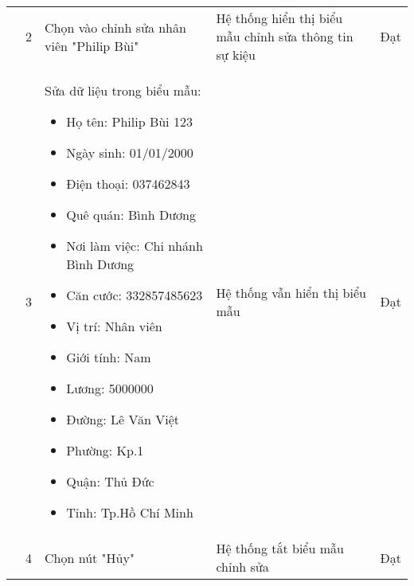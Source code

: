 {\begin{longtable}{| p{2.5cm}| p{1cm}| p{5.5cm}| p{4.5cm} | p{1.5cm} |}
        \cline{2-5}
         & 2 & Chọn vào chỉnh sửa nhân viên "Philip Bùi" & Hệ thống hiển thị biểu mẫu chỉnh sửa thông tin sự kiệu & Đạt \\
        \cline{2-5}
        & 3 & Sửa dữ liệu trong biểu mẫu:
        \begin{itemize}
            \item Họ tên: Philip Bùi 123
            \item Ngày sinh: 01/01/2000
            \item Điện thoại: 037462843
            \item Quê quán: Bình Dương
            \item Nơi làm việc: Chi nhánh Bình Dương
            \item Căn cước: 332857485623
            \item Vị trí: Nhân viên
            \item Giới tính: Nam
            \item Lương: 5000000
            \item Đường: Lê Văn Việt
            \item Phường: Kp.1
            \item Quận: Thủ Đức 
            \item Tỉnh: Tp.Hồ Chí Minh
        \end{itemize} & Hệ thống vẫn hiển thị biểu mẫu & Đạt \\
        \cline{2-5}
         & 4 & Chọn nút "Hủy" & Hệ thống tắt biểu mẫu chỉnh sửa & Đạt \\
        \hline
    \end{longtable} 
}

